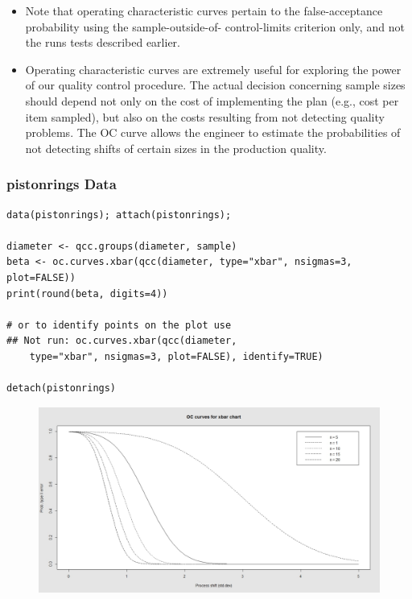 \documentclass[MASTER-SPC.tex]{subfiles}
\begin{document}
\begin{itemize}
\item Note that operating characteristic curves pertain to the false-acceptance probability using the sample-outside-of- control-limits criterion only, and not the runs tests described earlier.


\item Operating characteristic curves are extremely useful for exploring the power of our quality control procedure. The actual decision concerning sample sizes should depend not only on the cost of implementing the plan (e.g., cost per item sampled), but also on the costs resulting from not detecting quality problems. The OC curve allows the engineer to estimate the probabilities of not detecting shifts of certain sizes in the production quality.
\end{itemize}






\newpage
\subsubsection{pistonrings Data}
\begin{framed}
\begin{verbatim}
data(pistonrings); attach(pistonrings);

diameter <- qcc.groups(diameter, sample)
beta <- oc.curves.xbar(qcc(diameter, type="xbar", nsigmas=3, plot=FALSE))
print(round(beta, digits=4))

# or to identify points on the plot use
## Not run: oc.curves.xbar(qcc(diameter, 
    type="xbar", nsigmas=3, plot=FALSE), identify=TRUE)

detach(pistonrings)
\end{verbatim}
\end{framed}

\begin{figure}
\centering
\includegraphics[width=0.7\linewidth]{images/OCpistonrings}
\caption{}
\label{fig:OCpistonrings}
\end{figure}
\end{document}
